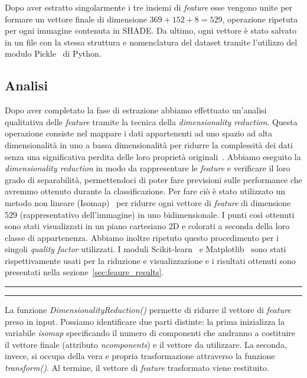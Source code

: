 Dopo aver estratto singolarmente i tre insiemi di \textit{feature}  esse vengono unite per formare un vettore finale di dimensione $369 + 152 + 8 = 529$, operazione ripetuta per ogni immagine contenuta in SHADE. Da ultimo, ogni vettore è stato salvato in un file con la stessa struttura e nomenclatura del dataset tramite l'utilizzo del modulo Pickle~\cite{pickle} di Python.

\subsection{Analisi}
\label{sub:isomap}

Dopo aver completato la fase di estrazione abbiamo effettuato un'analisi qualitativa delle \textit{feature} tramite la tecnica della \textit{dimensionality reduction}. Questa operazione consiste nel mappare i dati appartenenti ad uno spazio ad alta dimensionalità in uno a bassa dimensionalità per ridurre la complessità dei dati senza una significativa perdita delle loro proprietà originali~\cite{dimreduction}. Abbiamo eseguito la \textit{dimensionality reduction} in modo da rappresentare le \textit{feature} e verificare il loro grado di separabilità, permettendoci di poter fare previsioni sulle performance che avremmo ottenuto durante la classificazione. Per fare ciò è stato utilizzato un metodo non lineare (Isomap)~\cite{isomap} per ridurre ogni vettore di \textit{feature} di dimensione 529 (rappresentativo dell'immagine) in uno bidimensionale. I punti così ottenuti sono stati visualizzati in un piano cartesiano 2D e colorati a seconda della loro classe di appartenenza. Abbiamo inoltre ripetuto questo procedimento per i singoli \textit{quality factor} utilizzati. I moduli Scikit-learn~\cite{scikitlearn} e Matplotlib~\cite{matplotlib} sono stati rispettivamente usati per la riduzione e visualizzazione e i risultati ottenuti sono presentati nella sezione~\ref{sec:feaure_results}.

\begin{center}
\rule{9cm}{0.5pt}
\end{center}

\begin{center}
\rule{9cm}{0.5pt}
\end{center}

La funzione \textit{DimensionalityReduction()} permette di ridurre il vettore di \textit{feature} preso in input. Possiamo identificare due parti distinte: la prima inizializza la variabile \textit{isomap} specificando il numero di componenti che andranno a costituire il vettore finale (attributo \textit{n\textunderscore components}) e il vettore da utilizzare. La seconda, invece, si occupa della vera e propria trasformazione attraverso la funzione \textit{transform()}. Al termine, il vettore di \textit{feature} trasformato viene restituito.\newpage


